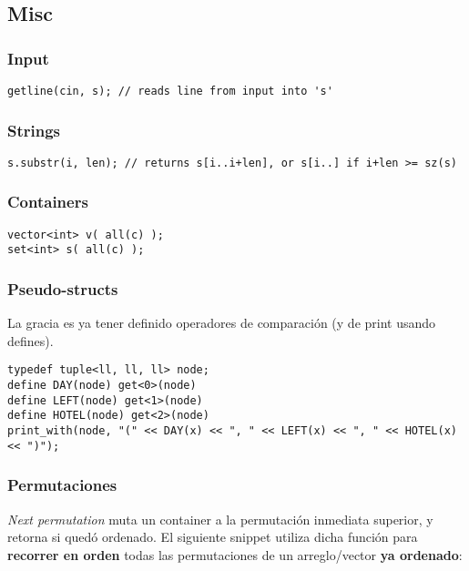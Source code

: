 
\subsection{Misc}

\subsubsection*{Input}

\begin{lstlisting}
getline(cin, s); // reads line from input into 's'
\end{lstlisting}

\subsubsection*{Strings}

\begin{lstlisting}
s.substr(i, len); // returns s[i..i+len], or s[i..] if i+len >= sz(s)
\end{lstlisting}

\subsubsection*{Containers}

\begin{lstlisting}
vector<int> v( all(c) );
set<int> s( all(c) );
\end{lstlisting}

\subsubsection*{Pseudo-structs}

La gracia es ya tener definido operadores de comparación (y de print usando defines).
\begin{lstlisting}
typedef tuple<ll, ll, ll> node;
define DAY(node) get<0>(node)
define LEFT(node) get<1>(node)
define HOTEL(node) get<2>(node)
print_with(node, "(" << DAY(x) << ", " << LEFT(x) << ", " << HOTEL(x) << ")");
\end{lstlisting}

\subsubsection*{Permutaciones}

\textit{Next permutation} muta un container a la permutación inmediata superior, y retorna si quedó ordenado. El siguiente snippet utiliza dicha función para \textbf{recorrer en orden} todas las permutaciones de un arreglo/vector \textbf{ya ordenado}:

